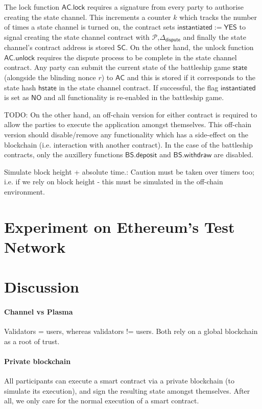 \documentclass{llncs}
\newcommand{\instantiated}{\mathsf{instantiated}}
\newcommand{\instantiatedno}{\mathsf{NO}}
\newcommand{\instantiatedyes}{\mathsf{YES}}
\newcommand{\hstate}{\mathsf{hstate}}
\newcommand{\stateinfo}{\mathsf{state}}
\newcommand{\participant}{\mathcal{P}}
\newcommand{\statechannel}{\mathsf{SC}}
\newcommand{\battleshipdeposit}{\mathsf{BS.deposit}}
\newcommand{\battleshipwithdraw}{\mathsf{BS.withdraw}}
\newcommand{\appcontract}{\mathsf{AC}}
\newcommand{\applock}{\mathsf{AC.lock}}
\newcommand{\appunlock}{\mathsf{AC.unlock}}
\newcommand{\timerdispute}{\mathsf{\Delta}_{\mathsf{dispute}}}
\begin{document}
The lock function $\applock$ requires a signature from every party to authorise creating the state channel. 
This increments a counter $k$ which tracks the number of times a state channel is turned on, the contract sets $\instantiated := \instantiatedyes$ to signal creating the state channel contract with $\participant$,$\timerdispute$ and finally the state channel's contract address is stored  $\statechannel$. 
On the other hand, the unlock function $\appunlock$ requires the dispute process to be complete in the state channel contract. 
Any party can submit the current state of the battleship game $\stateinfo$ (alongside the blinding nonce $r$) to $\appcontract$ and this is stored if it corresponds to the state hash $\hstate$ in the state channel contract. 
If successful, the flag $\instantiated$ is set as $\instantiatedno$ and all functionality is re-enabled in the battleship game. 


TODO: On the other hand, an off-chain version for either contract is required to allow the parties to execute the application amongst themselves. 
This off-chain version should disable/remove any functionality which has a side-effect on the blockchain (i.e. interaction with another contract).
In the case of the battleship contracts, only the auxillery functions $\battleshipdeposit$ and $\battleshipwithdraw$ are disabled. 

Simulate block height + absolute time.: Caution must be taken over timers too; i.e. if we rely on block height - this must be simulated in the off-chain environment. 

\section{Experiment on Ethereum's Test Network}

\section{Discussion} 

\paragraph{Channel vs Plasma} Validators = users, whereas validators != users. Both rely on a global blockchain as a root of trust. 

\paragraph{Private blockchain} All participants can execute a smart contract via a private blockchain (to simulate its execution), and sign the resulting state amongst themselves. After all, we only care for the normal execution of a smart contract. 
\end{document}
